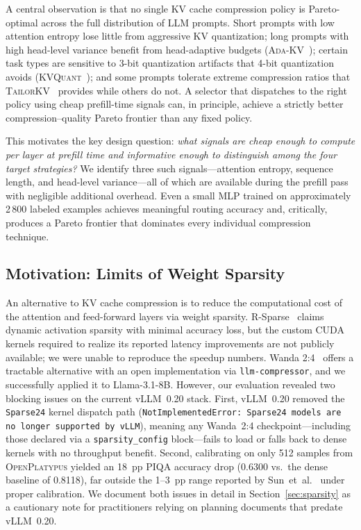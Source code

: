 \documentclass[conference]{IEEEtran}
\begin{document}
A central observation is that no single KV cache compression policy is
Pareto-optimal across the full distribution of LLM prompts.
Short prompts with low attention entropy lose little from aggressive KV
quantization; long prompts with high head-level variance benefit from
head-adaptive budgets (\textsc{Ada-KV}~\cite{adakv}); certain task types are
sensitive to 3-bit quantization artifacts that 4-bit quantization avoids
(\textsc{KVQuant}~\cite{hooper2024kvquant}); and some prompts tolerate
extreme compression ratios that \textsc{TailorKV}~\cite{tailorkv} provides
while others do not.
A selector that dispatches to the right policy using cheap prefill-time signals
can, in principle, achieve a strictly better compression--quality Pareto
frontier than any fixed policy.

This motivates the key design question: \emph{what signals are cheap enough to
compute per layer at prefill time and informative enough to distinguish among
the four target strategies?}
We identify three such signals---attention entropy, sequence length, and
head-level variance---all of which are available during the prefill pass with
negligible additional overhead.
Even a small MLP trained on approximately 2\,800 labeled examples achieves
meaningful routing accuracy and, critically, produces a Pareto frontier that
dominates every individual compression technique.

\subsection{Motivation: Limits of Weight Sparsity}
\label{sec:intro:sparsity}

An alternative to KV cache compression is to reduce the computational cost
of the attention and feed-forward layers via weight sparsity.
R-Sparse~\cite{rsparse} claims dynamic activation sparsity with minimal
accuracy loss, but the custom CUDA kernels required to realize its reported
latency improvements are not publicly available; we were unable to reproduce
the speedup numbers.
Wanda 2:4~\cite{sun2024wanda} offers a tractable alternative with an open
implementation via \texttt{llm-compressor}, and we successfully applied it to
Llama-3.1-8B.
However, our evaluation revealed two blocking issues on the current vLLM~0.20
stack.
First, vLLM~0.20 removed the \texttt{Sparse24} kernel dispatch path
(\texttt{NotImplementedError: Sparse24 models are no longer supported by
vLLM}), meaning any Wanda~2:4 checkpoint---including those declared via a
\texttt{sparsity\_config} block---fails to load or falls back to dense
kernels with no throughput benefit.
Second, calibrating on only 512 samples from \textsc{OpenPlatypus} yielded an
18~pp PIQA accuracy drop (0.6300 vs.\ the dense baseline of 0.8118), far
outside the 1--3~pp range reported by Sun~et~al.~\cite{sun2024wanda} under
proper calibration.
We document both issues in detail in Section~\ref{sec:sparsity} as a
cautionary note for practitioners relying on planning documents that predate
vLLM~0.20.
\end{document}

